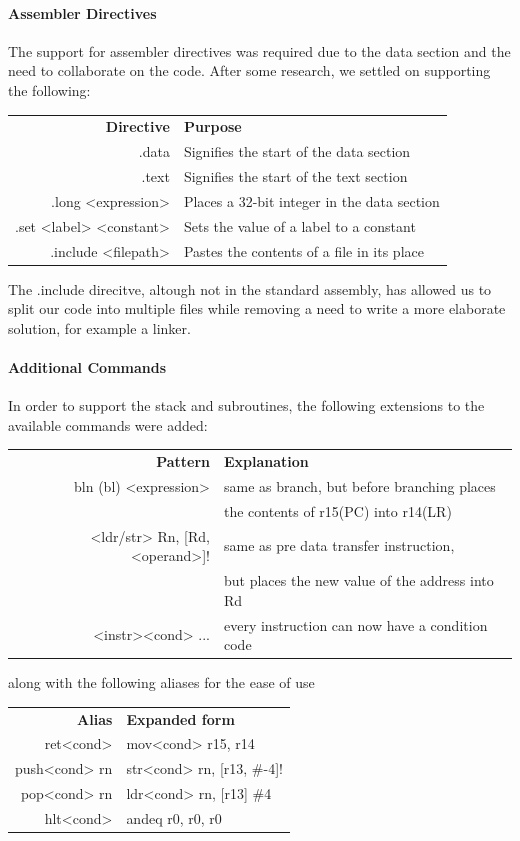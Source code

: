 \documentclass[11pt]{article}
\begin{document}
\paragraph*{Assembler Directives} The support for assembler directives was required due to the data section and the need to collaborate on the code. After some research, we settled on supporting the following:
\begin{center}
	\begin{tabular}{r|l}
		\textbf{Directive} & \textbf{Purpose} \\
		.data & Signifies the start of the data section \\
		.text & Signifies the start of the text section \\
		.long <expression> & Places a 32-bit integer in the data section \\
		.set <label> <constant> & Sets the value of a label to a constant \\
		.include <filepath> & Pastes the contents of a file in its place
	\end{tabular}
\end{center}
The .include direcitve, altough not in the standard assembly, has allowed us to split our code into multiple files while removing a need to write a more elaborate solution, for example a linker.
\paragraph*{Additional Commands}
In order to support the stack and subroutines, the following extensions to the available commands were added:
\begin{center}
	\begin{tabular}{r|l}
		\textbf{Pattern} & \textbf{Explanation} \\
		bln (bl) <expression> & same as branch, but before branching places \\
		                      & the contents of r15(PC) into r14(LR) \\
		<ldr/str> Rn, [Rd, <operand>]! & same as pre data transfer instruction, \\
		                               & but places the new value of the address into Rd \\
		<instr><cond> ... & every instruction can now have a condition code
	\end{tabular}
\end{center}
along with the following aliases for the ease of use
\begin{center}
	\begin{tabular}{r|l}
		\textbf{Alias} & \textbf{Expanded form} \\
		ret<cond> & mov<cond> r15, r14\\
		push<cond> rn & str<cond> rn, [r13, \#-4]!\\
		pop<cond> rn & ldr<cond> rn, [r13] \#4\\
		hlt<cond> & andeq r0, r0, r0
	\end{tabular}
\end{center}
\end{document}
